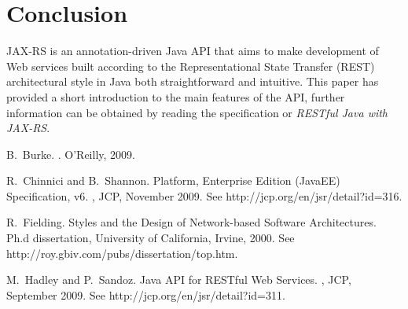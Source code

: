 \documentclass{acm_proc_article-sp}
\begin{document}
\section{Conclusion}

JAX-RS is an annotation-driven Java API that aims to make development of Web services built according to the Representational State Transfer\cite{rest} (REST) architectural style in Java both straightforward and intuitive. This paper has provided a short introduction to the main features of the API, further information can be obtained by reading the specification\cite{jaxrs11} or \textit{RESTful Java with JAX-RS}\cite{burke:restfuljava}.

%
\begin{thebibliography}{1}

B.~Burke.
.
\newblock O'Reilly, 2009.

R.~Chinnici and B.~Shannon.
 {Platform}, {Enterprise} {Edition} {(JavaEE)} {Specification},
  {v6}.
, JCP, November 2009.
\newblock See http://jcp.org/en/jsr/detail?id=316.

R.~Fielding.
 {Styles} and the {Design} of {Network-based}
  {Software} {Architectures}.
\newblock Ph.d dissertation, University of California, Irvine, 2000.
\newblock See http://roy.gbiv.com/pubs/dissertation/top.htm.

M.~Hadley and P.~Sandoz.
 {Java} {API} for {RESTful} {Web} {Services}.
, JCP, September 2009.
\newblock See http://jcp.org/en/jsr/detail?id=311.

\end{thebibliography}
\end{document}
